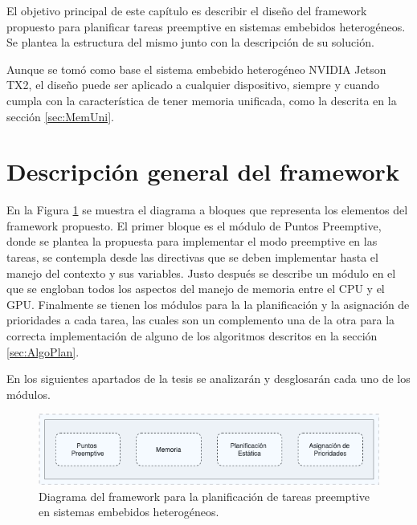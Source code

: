 El objetivo principal de este capítulo es describir el diseño del framework propuesto para planificar tareas preemptive en sistemas embebidos heterogéneos. Se plantea la estructura del mismo junto con la descripción de su solución. 

Aunque se tomó como base el sistema embebido heterogéneo NVIDIA Jetson TX2, el diseño puede ser aplicado a cualquier dispositivo, siempre y cuando cumpla con la característica de tener memoria unificada, como la descrita en la sección \ref{sec:MemUni}.

\section{Descripción general del framework}

En la Figura \ref{fig:diagramabase} se muestra el diagrama a bloques que representa los elementos del framework propuesto. El primer bloque es el módulo de Puntos Preemptive, donde se plantea la propuesta para implementar el modo preemptive en las tareas, se contempla desde las directivas que se deben implementar hasta el manejo del contexto y sus variables. Justo después se describe un módulo en el que se engloban todos los aspectos del manejo de memoria entre el CPU y el GPU. Finalmente se tienen los módulos para la la planificación y la asignación de prioridades a cada tarea, las cuales son un complemento una de la otra para la correcta implementación de alguno de los algoritmos descritos en la sección \ref{sec:AlgoPlan}.

\vspace{0.3cm}

En los siguientes apartados de la tesis se analizarán y desglosarán cada uno de los módulos.
  \begin{figure}[ht]
      \centering
        \includegraphics[scale=.8]{img/diagrama_framework}
        \caption{Diagrama del framework para la planificación de tareas preemptive en sistemas embebidos heterogéneos.}
        \label{fig:diagramabase}
    \end{figure}
  

  
